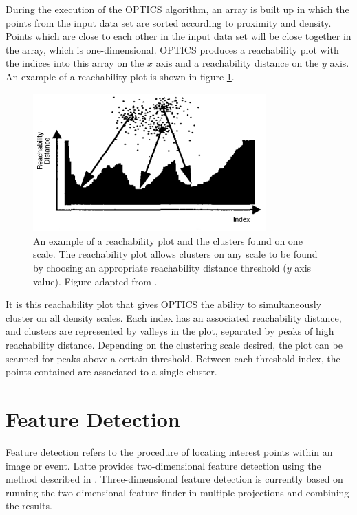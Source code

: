 During the execution of the \ac{OPTICS} algorithm, an array is built up in which the points from the input data set are sorted according to proximity and density. Points which are close to each other in the input data set will be close together in the array, which is one-dimensional. \ac{OPTICS} produces a reachability plot with the indices into this array on the $x$ axis and a reachability distance on the $y$ axis. An example of a reachability plot is shown in figure \ref{fig:optics-reachability-plot}.

\begin{figure}
    \centering
    \includegraphics[width=0.8\textwidth]{chapters/latte_images/optics-reachability}
    \caption[Reachability plot from the OPTICS clustering algorithm]{\label{fig:optics-reachability-plot}An example of a reachability plot and the clusters found on one scale. The reachability plot allows clusters on any scale to be found by choosing an appropriate reachability distance threshold ($y$ axis value). Figure adapted from \citep{Ankerst1999}.}
\end{figure}

It is this reachability plot that gives \ac{OPTICS} the ability to simultaneously cluster on all density scales. Each index has an associated reachability distance, and clusters are represented by valleys in the plot, separated by peaks of high reachability distance. Depending on the clustering scale desired, the plot can be scanned for peaks above a certain threshold. Between each threshold index, the points contained are associated to a single cluster.

\section{Feature Detection}\label{sec:latte_feature_detection}
Feature detection refers to the procedure of locating interest points within an image or event. Latte provides two-dimensional feature detection using the method described in \citep{Morgan2010}. Three-dimensional feature detection is currently based on running the two-dimensional feature finder in multiple projections and combining the results.

